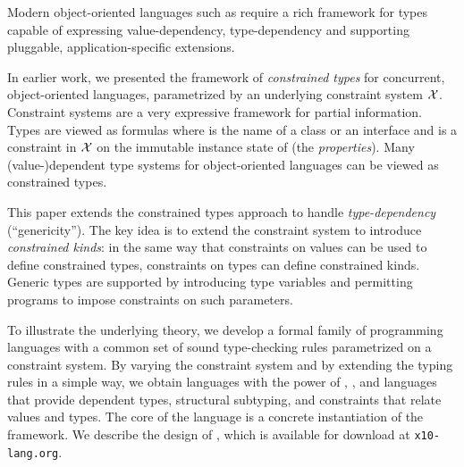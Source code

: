 Modern object-oriented languages such as \Xten require a rich framework
for types capable of expressing value-dependency, type-dependency
and supporting pluggable, application-specific extensions.

In earlier work, we presented the framework of \emph{constrained
types} for concurrent, object-oriented languages, parametrized by
an underlying constraint system $\cal X$. Constraint systems are a
very expressive framework for partial information. Types are viewed
as formulas  where  is the name of a class
or an interface and  is a constraint in $\cal X$ on the
immutable instance state of  (the \emph{properties}).
Many (value-)dependent type systems for object-oriented languages
can be viewed as constrained types.

This paper extends the constrained types approach to handle
\emph{type-dependency} (``genericity''). The key idea is to extend
the constraint system to introduce \emph{constrained kinds}: in
the same way that constraints on values can be used to define
constrained types, constraints on types can
define constrained kinds.
Generic types are supported
by introducing type variables and permitting programs to impose
constraints on such parameters.

To illustrate the underlying theory, we develop a formal family of
programming languages with a common set of sound type-checking rules
parametrized on a constraint system.  By varying the constraint system
and by extending the typing rules in a simple way, we obtain
languages with the power
of \FJ, \FGJ, and languages that provide dependent types, structural
subtyping, and constraints that relate values and types.  The core
of the \Xten language is a concrete instantiation of the framework.  We
describe the design of \Xten, which is available
for download at \texttt{x10-lang.org}.

